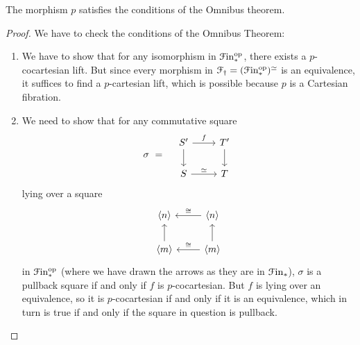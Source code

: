 \documentclass[main.tex]{subfiles}
\begin{document}
\begin{lemma}
  The morphism $p$ satisfies the conditions of the Omnibus theorem.
\end{lemma}
\begin{proof}
  We have to check the conditions of the Omnibus Theorem:
  \begin{enumerate}
    \item We have to show that for any isomorphism in $\mathcal{F}\mathrm{in}_{*}^{\mathrm{op}}$, there exists a $p$-cocartesian lift. But since every morphism in $\mathcal{F}_{\dagger} = (\mathcal{F}\mathrm{in}_{*}^{\mathrm{op}})^{\simeq}$ is an equivalence, it suffices to find a $p$-cartesian lift, which is possible because $p$ is a Cartesian fibration.

    \item We need to show that for any commutative square
      \begin{equation*}
        \sigma \ = \quad
        \begin{tikzcd}
          S'
          \arrow[r, "f"]
          \arrow[d]
          & T'
          \arrow[d]
          \\
          S
          \arrow[r, "\simeq"]
          & T
        \end{tikzcd}
      \end{equation*}
      lying over a square
      \begin{equation*}
        \begin{tikzcd}
          \langle n \rangle
          & \langle n \rangle
          \arrow[l, swap, "\cong"]
          \\
          \langle m \rangle
          \arrow[u]
          & \langle m \rangle
          \arrow[l, swap, "\cong"]
          \arrow[u]
        \end{tikzcd}
      \end{equation*}
      in $\mathcal{F}\mathrm{in}_{*}^{\mathrm{op}}$ (where we have drawn the arrows as they are in $\mathcal{F}\mathrm{in}_{*}$), $\sigma$ is a pullback square if and only if $f$ is $p$-cocartesian. But $f$ is lying over an equivalence, so it is $p$-cocartesian if and only if it is an equivalence, which in turn is true if and only if the square in question is pullback.
  \end{enumerate}
\end{proof}
\end{document}
